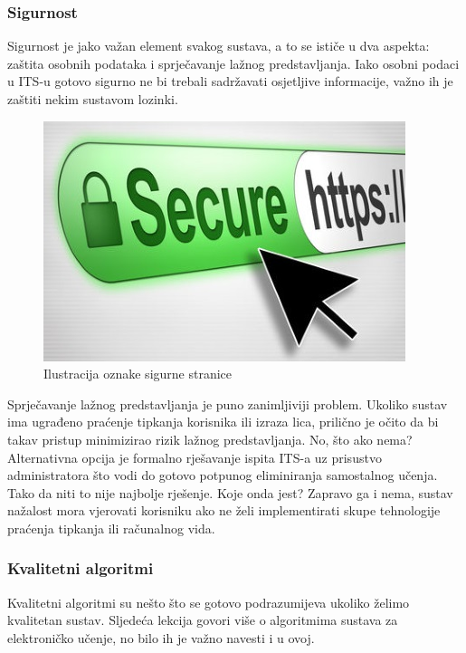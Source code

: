 \documentclass[times, utf8, zavrsni]{fer}
\begin{document}
\subsubsection{Sigurnost}
Sigurnost je jako važan element svakog sustava, a to se ističe u dva aspekta: zaštita osobnih podataka i sprječavanje lažnog predstavljanja. Iako osobni podaci u ITS-u gotovo sigurno ne bi trebali sadržavati osjetljive informacije, važno ih je zaštiti nekim sustavom lozinki.

\begin{figure}[htb]
	\centering
	\includegraphics[]{img/security.jpg}
	\caption{Ilustracija oznake sigurne stranice}
	\label{fig:security}
\end{figure}

\par
Sprječavanje lažnog predstavljanja je puno zanimljiviji problem. Ukoliko sustav ima ugrađeno praćenje tipkanja korisnika ili izraza lica, prilično je očito da bi takav pristup minimizirao rizik lažnog predstavljanja. No, što ako nema? Alternativna opcija je formalno rješavanje ispita ITS-a uz prisustvo administratora što vodi do gotovo potpunog eliminiranja samostalnog učenja. Tako da niti to nije najbolje rješenje. Koje onda jest? Zapravo ga i nema, sustav nažalost mora vjerovati korisniku ako ne želi implementirati skupe tehnologije praćenja tipkanja ili računalnog vida.

\subsubsection{Kvalitetni algoritmi}
Kvalitetni algoritmi su nešto što se gotovo podrazumijeva ukoliko želimo kvalitetan sustav. Sljedeća lekcija govori više o algoritmima sustava za elektroničko učenje, no bilo ih je važno navesti i u ovoj.
\end{document}
